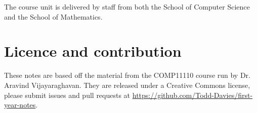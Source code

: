 The course unit is delivered by staff from both the School of Computer Science
and the School of Mathematics.

\section*{Licence and contribution}

These notes are based off the material from the COMP11110 course run by 
Dr. Aravind Vijayaraghavan. They are released
under a Creative Commons license, please submit issues and pull requests at
\url{https://github.com/Todd-Davies/first-year-notes}.
